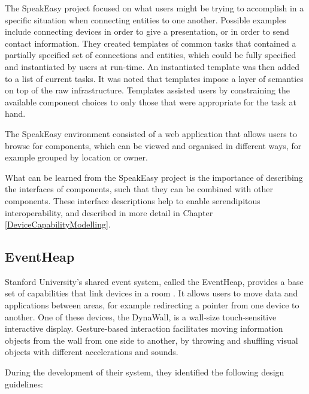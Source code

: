 \label{InformationFiltering} %
The SpeakEasy project focused on what users might be trying to accomplish in a specific situation when connecting entities to one another. Possible examples include connecting devices in order to give a presentation, or in order to send contact information. They created templates of common tasks that contained a partially specified set of connections and entities, which could be fully specified and instantiated by users at run-time. An instantiated template was then added to a list of current tasks. It was noted that templates impose a layer of semantics on top of the raw infrastructure. Templates assisted users by constraining the available component choices to only those that were appropriate for the task at hand.

The SpeakEasy environment consisted of a web application that allows users to browse for components, which can be viewed and organised in different ways, for example grouped by location or owner.

What can be learned from the SpeakEasy project is the importance of describing the interfaces of components, such that they can be combined with other components. These interface descriptions help to enable serendipitous interoperability, and described in more detail in Chapter \ref{DeviceCapabilityModelling}. 


\subsection{EventHeap}

Stanford University's shared event system, called the EventHeap, provides a base set of capabilities that link devices in a room \cite{Winograd2005}. It allows users to move data and applications between areas, for example redirecting a pointer from one device to another. One of these devices, the DynaWall, is a wall-size touch-sensitive interactive display. Gesture-based interaction facilitates moving information objects from the wall from one side to another, by throwing and shuffling visual objects with different accelerations and sounds.

During the development of their system, they identified the following design guidelines:


